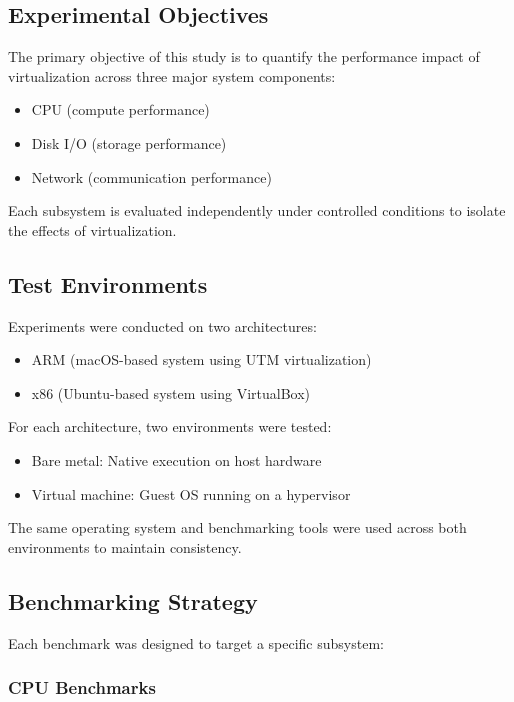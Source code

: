 \documentclass[conference]{IEEEtran}
\begin{document}
\subsection{Experimental Objectives}

The primary objective of this study is to quantify the performance impact of virtualization across three major system components:

\begin{itemize}
    \item CPU (compute performance)
    \item Disk I/O (storage performance)
    \item Network (communication performance)
\end{itemize}

Each subsystem is evaluated independently under controlled conditions to isolate the effects of virtualization.

\subsection{Test Environments}

Experiments were conducted on two architectures:

\begin{itemize}
    \item ARM (macOS-based system using UTM virtualization)
    \item x86 (Ubuntu-based system using VirtualBox)
\end{itemize}

For each architecture, two environments were tested:

\begin{itemize}
    \item Bare metal: Native execution on host hardware
    \item Virtual machine: Guest OS running on a hypervisor
\end{itemize}

The same operating system and benchmarking tools were used across both environments to maintain consistency.

\subsection{Benchmarking Strategy}

Each benchmark was designed to target a specific subsystem:

\subsubsection{CPU Benchmarks}
\end{document}
